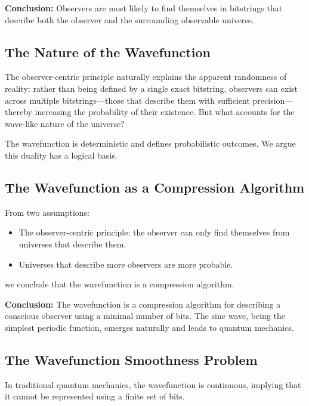 \documentclass[11pt]{article}
\begin{document}
\textbf{Conclusion:} Observers are most likely to find themselves in bitstrings that describe both the observer and the 
surrounding observable universe.



\subsection{The Nature of the Wavefunction}

The observer-centric principle naturally explains the apparent randomness of reality: rather than being defined by a single exact bitstring, observers can exist across multiple bitstrings—those that describe them with sufficient precision—thereby increasing the probability of their existence. But what accounts for the wave-like nature of the universe?

The wavefunction is deterministic and defines probabilistic outcomes. We argue this duality has a logical basis.

\subsection{The Wavefunction as a Compression Algorithm}

From two assumptions:

\begin{itemize}
      \item The observer-centric principle: the observer can only find themselves from universes that describe them.
      \item Universes that describe more observers are more probable.
\end{itemize}

we conclude that the wavefunction is a compression algorithm.

\textbf{Conclusion:} The wavefunction is a compression algorithm for describing a conscious observer using a minimal number of bits. The sine wave, being the simplest periodic function, emerges naturally and leads to quantum mechanics.



\subsection{The Wavefunction Smoothness Problem}

In traditional quantum mechanics, the wavefunction is continuous, implying that it cannot be represented using a finite set of bits.
\end{document}
